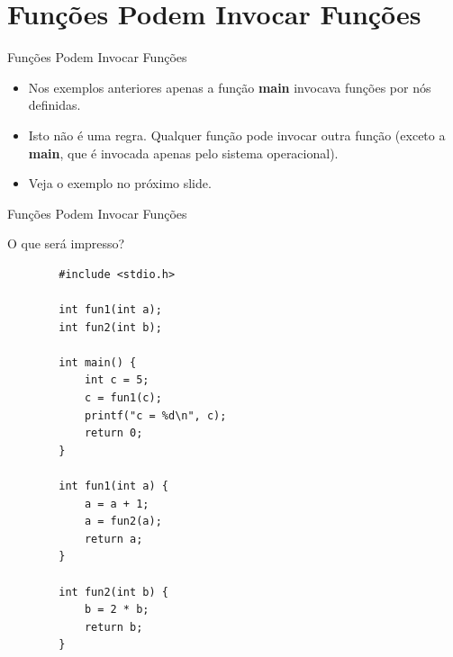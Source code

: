 \documentclass[handout]{beamer}
\begin{document}

\section{Funções Podem Invocar Funções}

\begin{frame}[fragile]{Funções Podem Invocar Funções}

    \begin{itemize}
        \item Nos exemplos anteriores apenas a função {\bf main} invocava funções por nós definidas.
        \item Isto não é uma regra. Qualquer função pode invocar outra função (exceto a {\bf main}, que é invocada apenas pelo sistema operacional).
        \item Veja o exemplo no próximo slide.
    \end{itemize}
\end{frame}

\begin{frame}[fragile]{Funções Podem Invocar Funções}

    O que será impresso?

            \begin{verbatim}
        #include <stdio.h>

        int fun1(int a);
        int fun2(int b);

        int main() {
            int c = 5;
            c = fun1(c);
            printf("c = %d\n", c);
            return 0;
        }

        int fun1(int a) {
            a = a + 1;
            a = fun2(a);
            return a;
        }

        int fun2(int b) {
            b = 2 * b;
            return b;
        }
    \end{verbatim}
\end{frame}

\end{document}
